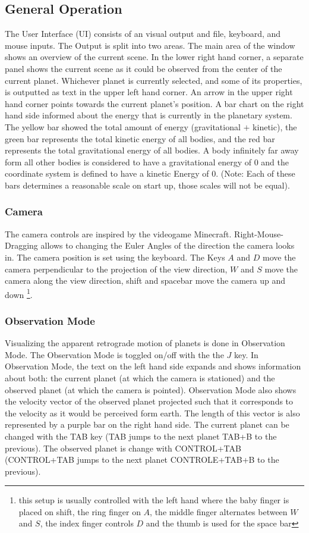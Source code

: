 \documentclass[a4paper,onesided,10pt]{article}
\begin{document}
\subsection{General Operation}
The User Interface (UI) consists of an visual output and file, keyboard, and mouse inputs. The Output is split into two areas. The main area of the window shows an overview of the current scene. In the lower right hand corner, a separate panel shows the current scene as it could be observed from the center of the current planet. Whichever planet is currently selected, and some of its properties, is outputted as text in the upper left hand corner. An arrow in the upper right hand corner points towards the current planet's position. A bar chart on the right hand side informed about the energy that is currently in the planetary system. The yellow bar showed the total amount of energy (gravitational $+$ kinetic), the green bar represents the total kinetic energy of all bodies, and the red bar represents the total gravitational energy of all bodies. A body infinitely far away form all other bodies is considered to have a gravitational energy of $0$ and the coordinate system is defined to have a kinetic Energy of $0$. (Note: Each of these bars determines a reasonable scale on start up, those scales will not be equal).

\subsubsection{Camera}
The camera controls are inspired by the videogame Minecraft. Right-Mouse-Dragging allows to changing the Euler Angles of the direction the camera looks in. The camera position is set using the keyboard. The Keys $A$ and $D$ move the camera perpendicular to the projection of the view direction, $W$ and $S$ move the camera along the view direction, shift and spacebar move the camera up and down \footnote{this setup is usually controlled with the left hand where the baby finger is placed on shift, the ring finger on $A$, the middle finger alternates between $W$ and $S$, the index finger controls $D$ and the thumb is used for the space bar}.

\subsubsection{Observation Mode}
Visualizing the apparent retrograde motion of planets is done in Observation Mode. The Observation Mode is toggled on/off with the the $J$ key. In Observation Mode, the text on the left hand side expands and shows information about both: the current planet (at which the camera is stationed) and the observed planet (at which the camera is pointed). Observation Mode also shows the velocity vector of the observed planet projected such that it corresponds to the velocity as it would be perceived form earth. The length of this vector is also represented by a purple bar on the right hand side. The current planet can be changed with the TAB key (TAB jumps to the next planet TAB+B to the previous). The observed planet is change with CONTROL+TAB (CONTROL+TAB jumps to the next planet CONTROLE+TAB+B to the previous).
\end{document}
